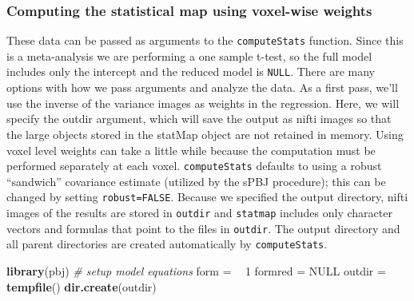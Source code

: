\documentclass[]{article}
\newenvironment{Shaded}{\begin{snugshade}}{\end{snugshade}}
\newcommand{\KeywordTok}[1]{\textcolor[rgb]{0.13,0.29,0.53}{\textbf{#1}}}
\newcommand{\DecValTok}[1]{\textcolor[rgb]{0.00,0.00,0.81}{#1}}
\newcommand{\StringTok}[1]{\textcolor[rgb]{0.31,0.60,0.02}{#1}}
\newcommand{\CommentTok}[1]{\textcolor[rgb]{0.56,0.35,0.01}{\textit{#1}}}
\newcommand{\OtherTok}[1]{\textcolor[rgb]{0.56,0.35,0.01}{#1}}
\newcommand{\ErrorTok}[1]{\textcolor[rgb]{0.64,0.00,0.00}{\textbf{#1}}}
\newcommand{\NormalTok}[1]{#1}
\begin{document}
\subsubsection{Computing the statistical map using voxel-wise
weights}\label{computing-the-statistical-map-using-voxel-wise-weights}

These data can be passed as arguments to the \texttt{computeStats}
function. Since this is a meta-analysis we are performing a one sample
t-test, so the full model includes only the intercept and the reduced
model is \texttt{NULL}. There are many options with how we pass
arguments and analyze the data. As a first pass, we'll use the inverse
of the variance images as weights in the regression. Here, we will
specify the outdir argument, which will save the output as nifti images
so that the large objects stored in the statMap object are not retained
in memory. Using voxel level weights can take a little while because the
computation must be performed separately at each voxel.
\texttt{computeStats} defaults to using a robust ``sandwich'' covariance
estimate (utilized by the sPBJ procedure); this can be changed by
setting \texttt{robust=FALSE}. Because we specified the output
directory, nifti images of the results are stored in \texttt{outdir} and
\texttt{statmap} includes only character vectors and formulas that point
to the files in \texttt{outdir}. The output directory and all parent
directories are created automatically by \texttt{computeStats}.

\begin{Shaded}
\begin{Highlighting}[]
\KeywordTok{library}\NormalTok{(pbj)}
\CommentTok{# setup model equations}
\NormalTok{form =}\StringTok{ }\ErrorTok{~}\StringTok{ }\DecValTok{1}
\NormalTok{formred =}\StringTok{ }\OtherTok{NULL}
\NormalTok{outdir =}\StringTok{ }\KeywordTok{tempfile}\NormalTok{()}
\KeywordTok{dir.create}\NormalTok{(outdir)}
\end{Highlighting}
\end{Shaded}
\end{document}
